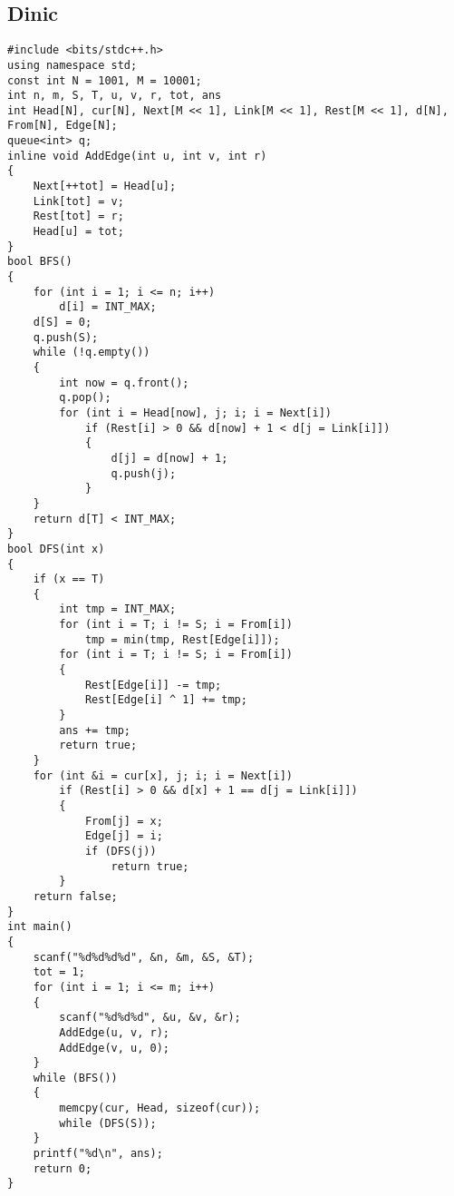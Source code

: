 \documentclass[a4paper]{article}
\begin{document}
\subsection{Dinic}
\begin{lstlisting}
#include <bits/stdc++.h>
using namespace std;
const int N = 1001, M = 10001;
int n, m, S, T, u, v, r, tot, ans
int Head[N], cur[N], Next[M << 1], Link[M << 1], Rest[M << 1], d[N], From[N], Edge[N];
queue<int> q;
inline void AddEdge(int u, int v, int r)
{
    Next[++tot] = Head[u];
    Link[tot] = v;
    Rest[tot] = r;
    Head[u] = tot;
}
bool BFS()
{
    for (int i = 1; i <= n; i++)
        d[i] = INT_MAX;
    d[S] = 0;
    q.push(S);
    while (!q.empty())
    {
        int now = q.front();
        q.pop();
        for (int i = Head[now], j; i; i = Next[i])
            if (Rest[i] > 0 && d[now] + 1 < d[j = Link[i]])
            {
                d[j] = d[now] + 1;
                q.push(j);
            }
    }
    return d[T] < INT_MAX;
}
bool DFS(int x)
{
    if (x == T)
    {
        int tmp = INT_MAX;
        for (int i = T; i != S; i = From[i])
            tmp = min(tmp, Rest[Edge[i]]);
        for (int i = T; i != S; i = From[i])
        {
            Rest[Edge[i]] -= tmp;
            Rest[Edge[i] ^ 1] += tmp;
        }
        ans += tmp;
        return true;
    }
    for (int &i = cur[x], j; i; i = Next[i])
        if (Rest[i] > 0 && d[x] + 1 == d[j = Link[i]])
        {
            From[j] = x;
            Edge[j] = i;
            if (DFS(j))
                return true;
        }
    return false;
}
int main()
{
    scanf("%d%d%d%d", &n, &m, &S, &T);
    tot = 1;
    for (int i = 1; i <= m; i++)
    {
        scanf("%d%d%d", &u, &v, &r);
        AddEdge(u, v, r);
        AddEdge(v, u, 0);
    }
    while (BFS())
    {
        memcpy(cur, Head, sizeof(cur));
        while (DFS(S));
    }
    printf("%d\n", ans);
    return 0;
}
\end{lstlisting}
\end{document}
